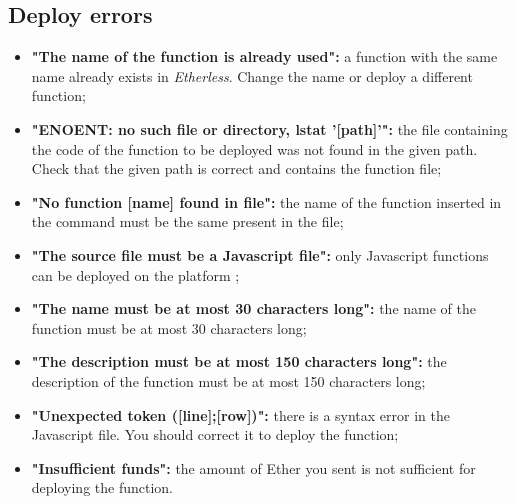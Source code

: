   \subsection{Deploy errors}
  \begin{itemize}
    \item \textbf{"The name of the function is already used":} a function with the same name already exists in \textit{Etherless}. Change the name or deploy a different function;
    \item \textbf{"ENOENT: no such file or directory, lstat '[path]'":} the file containing the code of the function to be deployed was not found in the given path. Check that the given path is correct and contains the function file;
    \item \textbf{"No function [name] found in file":} the name of the function inserted in the command must be the same present in the file;
    \item \textbf{"The source file must be a Javascript file":} only Javascript functions can be deployed on the platform ;
    \item \textbf{"The name must be at most 30 characters long":} the name of the function must be at most 30 characters long;
    \item \textbf{"The description must be at most 150 characters long":} the description of the function must be at most 150 characters long;
    \item \textbf{"Unexpected token ([line];[row])":} there is a syntax error in the Javascript file. You should correct it to deploy the function; 
    \item \textbf{"Insufficient funds":} the amount of Ether you sent is not sufficient for deploying the function.
  \end{itemize}
  
